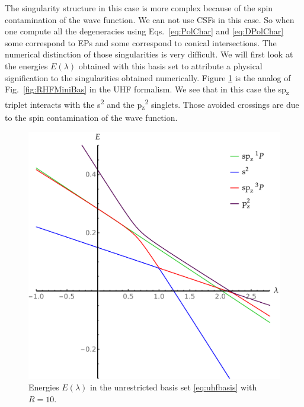 \documentclass[11pt,a4paper]{article}
\begin{document}
The singularity structure in this case is more complex because of the spin contamination of the wave function. We can not use CSFs in this case. So when one compute all the degeneracies using Eqs.~\eqref{eq:PolChar} and \eqref{eq:DPolChar} some correspond to EPs and some correspond to conical intersections. The numerical distinction of those singularities is very difficult. We will first look at the energies $E(\lambda)$ obtained with this basis set to attribute a physical signification to the singularities obtained numerically.
Figure \ref{fig:UHFMiniBas} is the analog of Fig.~\ref{fig:RHFMiniBas} in the UHF formalism. We see that in this case the sp\textsubscript{z} triplet interacts with the s\textsuperscript{2} and the p\textsubscript{z}\textsuperscript{2} singlets. Those avoided crossings are due to the spin contamination of the wave function.

\begin{figure}[h!]
    \centering
    \includegraphics[width=0.5\linewidth]{EMP_UHF_R10.pdf}
    \caption{Energies $E(\lambda)$ in the unrestricted basis set \eqref{eq:uhfbasis} with $R=10$.}
    \label{fig:UHFMiniBas}
\end{figure}
\end{document}
